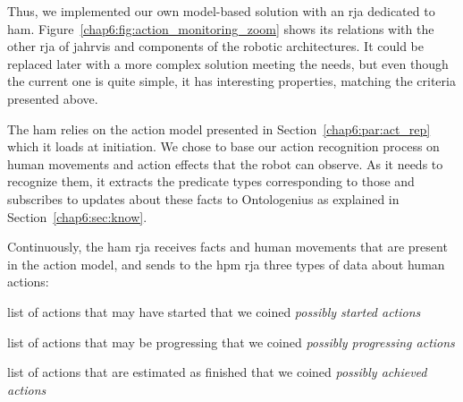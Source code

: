 \documentclass[a4paper,11pt,twoside]{StyleThese}
\begin{document}
Thus, we implemented our own model-based solution with an \acrshort{rja} dedicated to \acrfull{ham}. Figure~\ref{chap6:fig:action_monitoring_zoom} shows its relations with the other \acrshort{rja} of \acrshort{jahrvis}  and components of the robotic architectures. It could be replaced later with a more complex solution meeting the needs, but even though the current one is quite simple, it has interesting properties, matching the criteria presented above.

The \acrshort{ham} relies on the action model presented in Section~\ref{chap6:par:act_rep} which it loads at initiation. We chose to base our action recognition process on human movements and action effects that the robot can observe. As it needs to recognize them, it extracts the predicate types corresponding to those and subscribes to updates about these facts to Ontologenius as explained in Section~\ref{chap6:sec:know}. 

Continuously, the \acrshort{ham} \acrshort{rja} receives facts and human movements that are present in the action model, and sends to the \acrfull{hpm} \acrshort{rja} three types of data about human actions: 
\begin{bulletList}
	\item list of actions that may have started that we coined \emph{possibly started actions}
	\item list of actions that may be progressing that we coined \emph{possibly progressing actions}
	\item list of actions that are estimated as finished that we coined \emph{possibly achieved actions} 
\end{bulletList}
\end{document}

